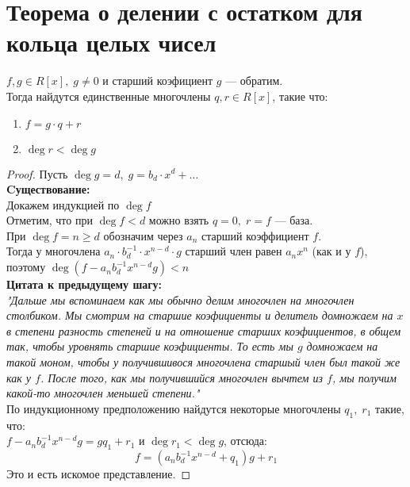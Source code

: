 
\section{Теорема о делении с остатком для кольца целых чисел}
\begin{normalsize}

\begin{theorem-non}
    $f,g \in R[x],\; g \neq 0$ и старший коэфициент $g$ --- обратим. \\
    Тогда найдутся единственные многочлены $q,r \in R[x]$, такие что: \\
    \begin{enumerate}
        \item $f = g\cdot q + r$
        \item $\deg r < \deg g$
    \end{enumerate}
\end{theorem-non}

\begin{proof}
    Пусть $\deg g = d,\; g = b_d\cdot x^d + \dots$\\

    \textbf{Cуществование:}\\
    Докажем индукцией по $\deg f$ \\
    Отметим, что при $\deg f < d$ можно взять $q = 0,\; r = f$ --- база. \\
    При $\deg f = n \geqslant d$ обозначим через $a_n$ старший коэффициент $f$. \\
    Тогда у многочлена $a_n\cdot b_d^{-1}\cdot x^{n-d}\cdot g$ старший член равен $a_nx^n$ (как и у $f$), \\
    поэтому $\deg(f-a_nb_d^{-1}x^{n-d}g) < n$ \\

    \textbf{Цитата к предыдущему шагу:}\\
    \emph{"Дальше мы вспоминаем как мы обычно делим многочлен на многочлен столбиком.
    Мы смотрим на старшие коэфициенты и делитель домножаем на $x$ в степени разность степеней
    и на отношение старших коэфициентов, в общем так, чтобы уровнять старшие коэфициенты.
    То есть мы $g$ домножаем на такой моном, чтобы у получившивося многочлена старшый член был такой же как у $f$.
    После того, как мы получившийся многочлен вычтем из $f$, мы получим какой-то многочлен меньшей степени."} \\
    
    По индукционному предположению найдутся некоторые многочлены $q_1,\; r_1$ такие, что: \\
    $f-a_nb_d^{-1}x^{n-d}g = gq_1 + r_1$ и $\deg r_1 < \deg g$, отсюда: \\
    \begin{equation*}
        f = (a_nb_d^{-1}x^{n-d} + q_1)g + r_1
    \end{equation*}
    Это и есть искомое представление.


\end{proof}
\end{normalsize}
